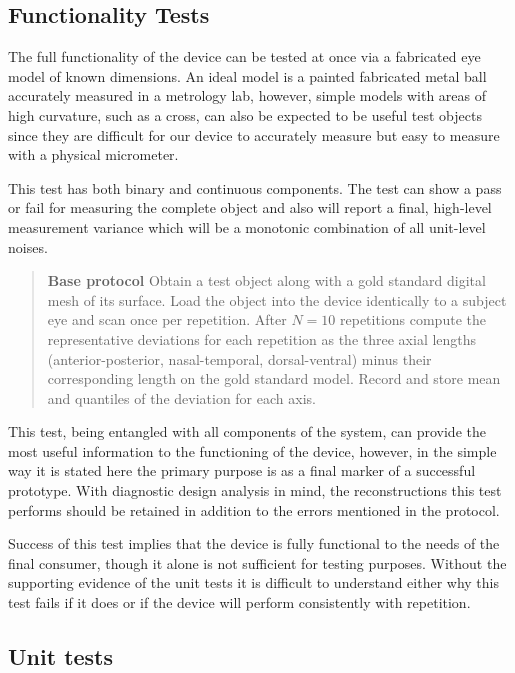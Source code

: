 \documentclass{article}
\begin{document}
\subsection{Functionality Tests}
\label{sec:functional-tests}

The full functionality of the device can be tested at once via a fabricated eye model of known dimensions. An ideal model is a painted fabricated metal ball accurately measured in a metrology lab, however, simple models with areas of high curvature, such as a cross, can also be expected to be useful test objects since they are difficult for our device to accurately measure but easy to measure with a physical micrometer.

This test has both binary and continuous components. The test can show a pass or fail for measuring the complete object and also will report a final, high-level measurement variance which will be a monotonic combination of all unit-level noises.

\begin{quotation}
\noindent\textbf{Base protocol} Obtain a test object along with a gold standard digital mesh of its surface. Load the object into the device identically to a subject eye and scan once per repetition. After $N = 10$ repetitions compute the representative deviations for each repetition as the three axial lengths (anterior-posterior, nasal-temporal, dorsal-ventral) minus their corresponding length on the gold standard model. Record and store mean and quantiles of the deviation for each axis.
\end{quotation}

This test, being entangled with all components of the system, can provide the most useful information to the functioning of the device, however, in the simple way it is stated here the primary purpose is as a final marker of a successful prototype. With diagnostic design analysis in mind, the reconstructions this test performs should be retained in addition to the errors mentioned in the protocol.

Success of this test implies that the device is fully functional to the needs of the final consumer, though it alone is not sufficient for testing purposes. Without the supporting evidence of the unit tests it is difficult to understand either why this test fails if it does or if the device will perform consistently with repetition.

\subsection{Unit tests}
\label{sec:unit-tests}
\end{document}
